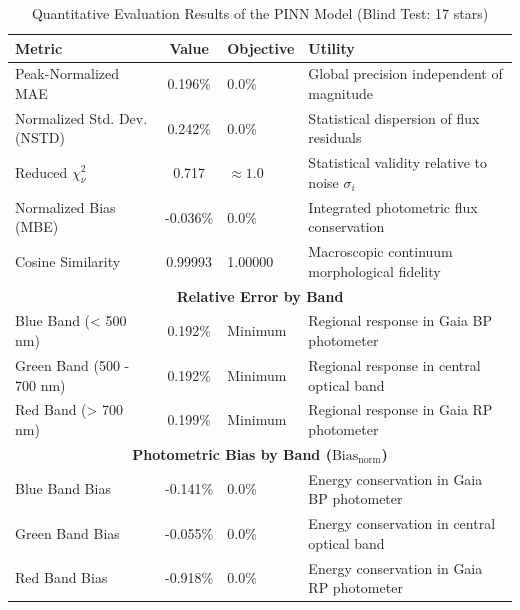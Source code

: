 
\begin{table}[htpb]
\centering
\caption{Quantitative Evaluation Results of the PINN Model (Blind Test: 17 stars)}
\label{tab:pinn_evaluation}
\begin{tabular}{lcll}
\hline
\textbf{Metric} & \textbf{Value} & \textbf{Objective} & \textbf{Utility} \\
\hline
Peak-Normalized MAE & 0.196\% & 0.0\% & Global precision independent of magnitude \\
Normalized Std. Dev. (NSTD) & 0.242\% & 0.0\% & Statistical dispersion of flux residuals \\
Reduced $\chi^2_\nu$ & 0.717 & $\approx 1.0$ & Statistical validity relative to noise $\sigma_i$ \\
Normalized Bias (MBE) & -0.036\% & 0.0\% & Integrated photometric flux conservation \\
Cosine Similarity & 0.99993 & 1.00000 & Macroscopic continuum morphological fidelity \\
\hline
\multicolumn{4}{c}{\textbf{Relative Error by Band}} \\
\hline
Blue Band (< 500 nm) & 0.192\% & Minimum & Regional response in Gaia BP photometer \\
Green Band (500 - 700 nm) & 0.192\% & Minimum & Regional response in central optical band \\
Red Band (> 700 nm) & 0.199\% & Minimum & Regional response in Gaia RP photometer \\
\hline
\multicolumn{4}{c}{\textbf{Photometric Bias by Band ($\text{Bias}_{\text{norm}}$)}} \\
\hline
Blue Band Bias & -0.141\% & 0.0\% & Energy conservation in Gaia BP photometer \\
Green Band Bias & -0.055\% & 0.0\% & Energy conservation in central optical band \\
Red Band Bias & -0.918\% & 0.0\% & Energy conservation in Gaia RP photometer \\
\hline
\end{tabular}
\end{table}
